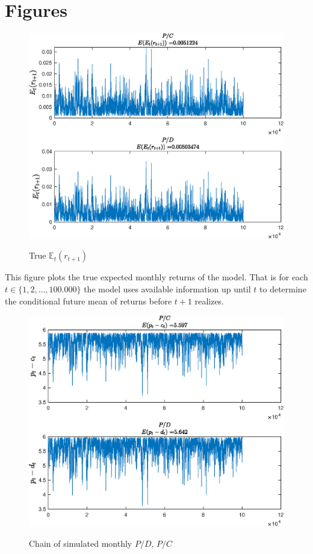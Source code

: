 \section{Figures}

\the\hsize

\begin{figure}[H]
    \centering
    \caption{True $\mathbb{E}_t\left(r_{t+1}\right)$}
    \includegraphics{Figures/Excess_Rets.eps}
    \label{fig:ExpExRets}
\end{figure}
This figure plots the true expected monthly returns of the model. That is for each $t\in\{1,2,...,100.000\}$ the model uses available information up until $t$ to determine the conditional future mean of returns before $t+1$ realizes. 

\begin{figure}[H]
    \centering
    \caption{Chain of simulated monthly $P/D$, $P/C$}
    \includegraphics{Figures/PCPDMonthly_chain.eps}
    \label{fig:PCPD}
\end{figure}


